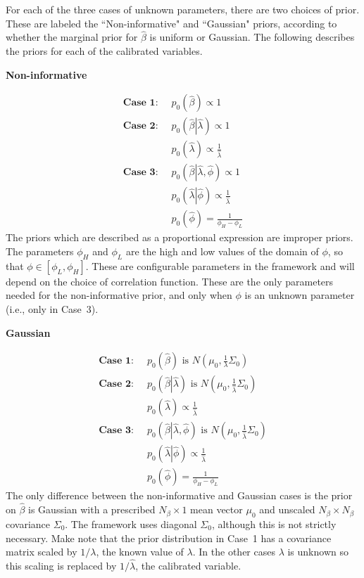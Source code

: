 \documentclass{book}
\begin{document}
For each of the three cases of unknown parameters, there are two choices of prior. These are labeled the ``Non-informative"
and ``Gaussian" priors, according to whether the marginal prior for $\hat \beta$ is uniform or Gaussian. The following describes
the priors for each of the calibrated variables.

\vspace{.1in}
\centerline{\textbf{Non-informative}}
\begin{align*}
\textbf{Case 1}: &\;\;p_0\left(\hat \beta\right) \propto 1
\\
\textbf{Case 2}: &\;\;p_0\left(\left. \hat \beta \right| \hat \lambda \right) \propto 1\\ 
			&\;\;p_0\left(\hat \lambda \right) \propto \frac{1}{\hat \lambda}
\\
\textbf{Case 3}: &\;\;p_0\left(\left. \hat \beta \right| \hat \lambda, \hat \phi \right) \propto 1 \\
			&\;\;p_0\left(\left. \hat \lambda \right| \hat \phi \right) \propto \frac{1}{\hat \lambda} \\
			&\;\;p_0\left(\hat \phi\right) = \frac{1}{\phi_H - \phi_L}
\end{align*}
The priors which are described as a proportional expression are improper priors. The parameters $\phi_H$ and
$\phi_L$ are the high and low values of the domain of $\phi$, so that $\phi \in [\phi_L, \phi_H]$. These are configurable
parameters in the framework and will depend on the choice of correlation function. These are the only parameters
needed for the non-informative prior, and only when $\phi$ is an unknown parameter (i.e., only in Case~3). 


\vspace{.1in}
\centerline{\textbf{Gaussian}}
\begin{align*}
\textbf{Case 1}: &\;\;p_0\left(\hat \beta\right) \text{ is } N\left(\mu_0, \frac{1}{\lambda} \Sigma_0\right)
\\
\textbf{Case 2}: &\;\;p_0\left(\left. \hat \beta \right| \hat \lambda \right)  \text{ is } N\left(\mu_0, \frac{1}{\hat \lambda} \Sigma_0\right)\\ 
			&\;\;p_0\left(\hat \lambda \right) \propto \frac{1}{\hat \lambda}
\\
\textbf{Case 3}: &\;\;p_0\left(\left. \hat \beta \right| \hat \lambda, \hat \phi \right)   \text{ is } N\left(\mu_0, \frac{1}{\hat \lambda} \Sigma_0\right) \\
			&\;\;p_0\left(\left. \hat \lambda \right| \hat \phi \right) \propto \frac{1}{\hat \lambda} \\
			&\;\;p_0\left(\hat \phi\right) = \frac{1}{ \phi_H - \phi_L}
\end{align*}
The only difference between the non-informative and Gaussian cases is the prior on $\hat \beta$ is Gaussian with a
prescribed $N_\beta \times 1$ mean vector $\mu_0$ and unscaled $N_\beta \times N_\beta$ covariance $\Sigma_0$. The
framework uses diagonal $\Sigma_0$, although this is not strictly necessary. Make note that the prior distribution in 
Case~1 has a covariance matrix scaled by $1 / \lambda$, the known value of $\lambda$. In the other cases $\lambda$ is
unknown so this scaling is replaced by $1 / \hat \lambda$, the calibrated variable. 
\end{document}
